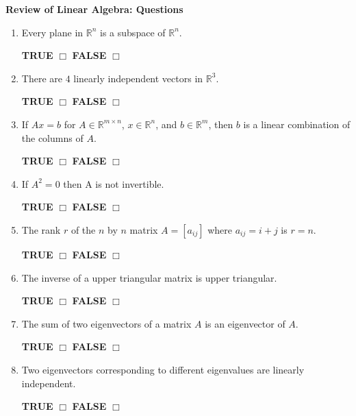 \documentclass[14pt]{report}
\begin{document}
\textbf{{Review of Linear Algebra: Questions}}\\
\thispagestyle{empty}


\begin{enumerate}
\item Every plane in $\mathbb{R}^n$ is a subspace of $\mathbb{R}^n$.  

\quad \textbf{TRUE} $\Box$ \quad\textbf{FALSE} $\Box$ 

\item There are $4$ linearly independent vectors in $\mathbb{R}^3$. 

\quad \textbf{TRUE} $\Box$ \quad\textbf{FALSE} $\Box$ 

\item If $Ax=b$ for $A \in \mathbb{R}^{m\times n}$, $x\in\mathbb{R}^n$, and  $b\in\mathbb{R}^m$, then $b$ is a linear combination of the columns of $A$.

 \quad \textbf{TRUE} $\Box$ \quad\textbf{FALSE} $\Box$


\item If $A^2=0$ then A is not invertible.

 \quad \textbf{TRUE} $\Box$ \quad\textbf{FALSE} $\Box$ 



\item The rank $r$ of the $n$ by $n$ matrix $A=[a_{ij}]$ where $a_{ij}=i+j$ is $r=n$.

 \quad \textbf{TRUE} $\Box$ \quad\textbf{FALSE} $\Box$


 


\item The inverse of a upper triangular matrix is upper triangular. 

\quad \textbf{TRUE} $\Box$ \quad\textbf{FALSE} $\Box$ 

\item The sum of two eigenvectors of a matrix $A$ is an eigenvector of $A$. 

\quad \textbf{TRUE} $\Box$ \quad\textbf{FALSE} $\Box$ 

\item Two eigenvectors corresponding to different eigenvalues  are linearly  independent.

 \quad \textbf{TRUE} $\Box$ \quad\textbf{FALSE} $\Box$ 


\end{enumerate}
\end{document}
